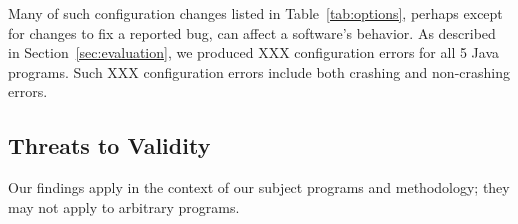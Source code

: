 
Many of such configuration changes listed in Table~\ref{tab:options},
perhaps except for changes to fix a reported bug, can affect
a software's behavior. As described in Section~\ref{sec:evaluation},
we produced XXX configuration errors for all 5 Java programs.
Such XXX configuration errors include both crashing and non-crashing errors.













\subsection{Threats to Validity}

Our findings apply in the context of our subject programs and methodology;
they may not apply to arbitrary programs.

